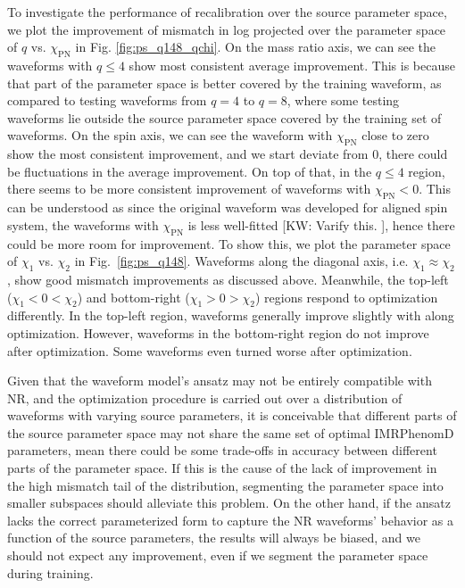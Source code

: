 \documentclass[twocolumn]{aastex631}
\newcommand{\kw}[1]{{\color{rb4}[KW: #1 ]}}
\begin{document}
To investigate the performance of recalibration over the source parameter space,
we plot the improvement of mismatch in log projected over the parameter space of
$q$ vs. $\chi_{\mathrm{PN}}$ in Fig. \ref{fig:ps_q148_qchi}. On the mass ratio
axis, we can see the waveforms with $q\le4$ show most consistent average
improvement. This is because that part of the parameter space is better covered
by the training waveform, as compared to testing waveforms from $q=4$ to $q=8$,
where some testing waveforms lie outside the source parameter space covered by
the training set of waveforms. On the spin axis, we can see the waveform with
$\chi_{\textrm{PN}}$ close to zero show the most consistent improvement, and we
start deviate from 0, there could be fluctuations in the average improvement. On
top of that, in the $q\le4$ region, there seems to be more consistent
improvement of waveforms with $\chi_{\textrm{PN}}<0$. This can be understood as
since the original waveform was developed for aligned spin system, the waveforms
with $\chi_{\textrm{PN}}$ is less well-fitted \kw{Varify this.}, hence there
could be more room for improvement. To show this, we plot the parameter space of
$\chi_1$ vs. $\chi_2$ in Fig.~\ref{fig:ps_q148}. Waveforms along the diagonal
axis, i.e. $\chi_1\approx\chi_2$, show good mismatch improvements as discussed
above. Meanwhile, the top-left ($\chi_1<0<\chi_2$) and bottom-right
($\chi_1>0>\chi_2$) regions respond to optimization differently. In the top-left
region, waveforms generally improve slightly with along optimization. However,
waveforms in the bottom-right region do not improve after optimization. Some
waveforms even turned worse after optimization. 

 Given that the waveform model's ansatz may not be entirely compatible with NR,
and the optimization procedure is carried out over a distribution of waveforms
with varying source parameters, it is conceivable that different parts of the
source parameter space may not share the same set of optimal IMRPhenomD
parameters, mean there could be some trade-offs in accuracy between different
parts of the parameter space. If this is the cause of the lack of improvement in
the high mismatch tail of the distribution, segmenting the parameter space into
smaller subspaces should alleviate this problem. On the other hand, if the
ansatz lacks the correct parameterized form to capture the NR waveforms'
behavior as a function of the source parameters, the results will always be
biased, and we should not expect any improvement, even if we segment the
parameter space during training.
\end{document}
